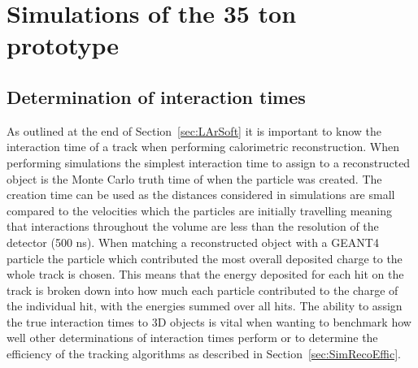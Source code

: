 

\chapter{Simulations of the 35 ton prototype}  %

\graphicspath{ {35tonSimulation/Figs/PDF/} {35tonSimulation/Figs/Vector/} } %

\section{Determination of interaction times} \label{sec:SimInteractionTimes} %
As outlined at the end of Section~\ref{sec:LArSoft} it is important to know the interaction time of a track when performing calorimetric reconstruction. When performing simulations the simplest interaction time to assign to a reconstructed object is the Monte Carlo truth time of when the particle was created. The creation time can be used as the distances considered in simulations are small compared to the velocities which the particles are initially travelling meaning that interactions throughout the volume are less than the resolution of the detector (500 ns). When matching a reconstructed object with a GEANT4 particle the particle which contributed the most overall deposited charge to the whole track is chosen. This means that the energy deposited for each hit on the track is broken down into how much each particle contributed to the charge of the individual hit, with the energies summed over all hits. The ability to assign the true interaction times to 3D objects is vital when wanting to benchmark how well other determinations of interaction times perform or to determine the efficiency of the tracking algorithms as described in Section~\ref{sec:SimRecoEffic}. \\

